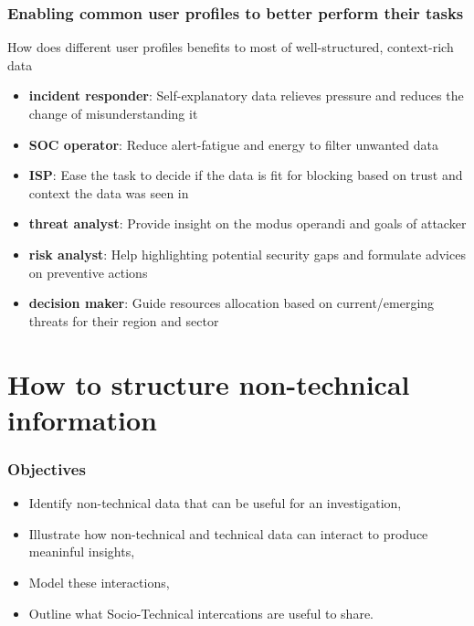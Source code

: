 \begin{frame}
    \frametitle{Enabling common user profiles to better perform their tasks}
    How does different user profiles benefits to most of well-structured, context-rich data
    \begin{itemize}
        \item \textbf{incident responder}: Self-explanatory data relieves pressure and reduces the change of misunderstanding it
        \item \textbf{SOC operator}: Reduce alert-fatigue and energy to filter unwanted data
        \item \textbf{ISP}: Ease the task to decide if the data is fit for blocking based on trust and context the data was seen in
        \item \textbf{threat analyst}: Provide insight on the modus operandi and goals of attacker
        \item \textbf{risk analyst}: Help highlighting potential security gaps and formulate advices on preventive actions
        \item \textbf{decision maker}: Guide resources allocation based on current/emerging threats for their region and sector
    \end{itemize}
\end{frame}


\section{How to structure non-technical information}
\begin{frame}
    \frametitle{Objectives}
    \begin{itemize}
        \item Identify non-technical data that can be useful for an investigation,
        \item Illustrate how non-technical and technical data can interact to produce meaninful insights,
        \item Model these interactions,
        \item Outline what Socio-Technical intercations are useful to share.
    \end{itemize}

\end{frame}


